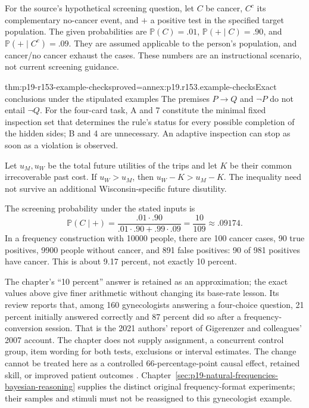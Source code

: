 For the source's hypothetical screening question, let \(C\) be cancer,
\(C^c\) its complementary no-cancer event, and
\(+\) a positive test in the specified target population. The given
probabilities are \(\mathbb P(C)=.01\),
\(\mathbb P(+\mid C)=.90\), and
\(\mathbb P(+\mid C^c)=.09\). They are assumed applicable to the
person's population, and cancer/no cancer exhaust the cases. These
numbers are an instructional scenario, not current screening guidance.

\begin{hbtheorem}{thm:p19-r153-example-checks}{proved=annex:p19.r153.example-checks}{Exact conclusions under the stipulated examples}
The premises \(P\to Q\) and \(\neg P\) do not entail
\(\neg Q\). For the four-card task, A and 7 constitute the minimal
fixed inspection set that determines the rule's status for every possible
completion of the hidden sides; B and 4 are unnecessary. An adaptive
inspection can stop as soon as a violation is observed.

Let \(u_M,u_W\) be the total future utilities of the trips and let
\(K\) be their common irrecoverable past cost. If \(u_W>u_M\),
then \(u_W-K>u_M-K\). The inequality need not survive an additional
Wisconsin-specific future disutility.

The screening probability under the stated inputs is
\[
 \mathbb P(C\mid +)=\frac{.01\cdot .90}
  {.01\cdot .90+.99\cdot .09}=\frac{10}{109}
  \mathrel{\approx}.09174.
\]
In a frequency construction with 10000 people, there are 100 cancer cases,
90 true positives, 9900 people without cancer, and 891 false positives:
90 of 981 positives have cancer. This is about 9.17 percent, not exactly
10 percent.
\end{hbtheorem}

The chapter's ``10 percent'' answer is retained as an approximation; the
exact values above give finer arithmetic without changing its base-rate lesson.
Its review reports that, among 160 gynecologists answering a four-choice
question, 21 percent initially answered correctly and 87 percent did so
after a frequency-conversion session. That is the 2021 authors' report of
Gigerenzer and colleagues' 2007 account. The chapter does not supply
assignment, a concurrent control group, item wording for both tests,
exclusions or interval estimates. The change cannot be treated here as a
controlled 66-percentage-point causal effect, retained skill, or improved
patient outcomes \cite[p.~803]{DeOliveiraNisbett2021Improve}.
Chapter~\ref{sec:p19-natural-frequencies-bayesian-reasoning} supplies the
distinct original frequency-format experiments; their samples and stimuli
must not be reassigned to this gynecologist example.

